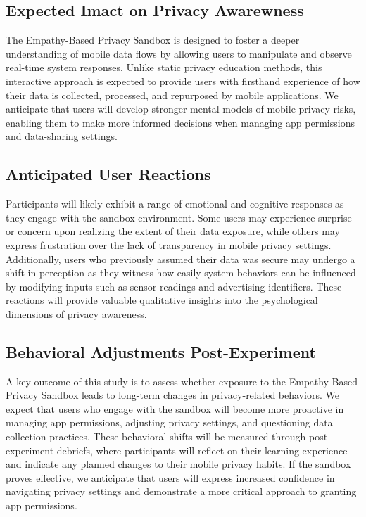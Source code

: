 \documentclass[acmlarge, nonacm]{acmart}
\begin{document}
\subsection{Expected Imact on Privacy Awarewness}

The Empathy-Based Privacy Sandbox is designed to foster a deeper understanding of mobile data flows by allowing users to manipulate and observe real-time system responses. Unlike static privacy education methods, this interactive approach is expected to provide users with firsthand experience of how their data is collected, processed, and repurposed by mobile applications. We anticipate that users will develop stronger mental models of mobile privacy risks, enabling them to make more informed decisions when managing app permissions and data-sharing settings.

\subsection{Anticipated User Reactions}
Participants will likely exhibit a range of emotional and cognitive responses as they engage with the sandbox environment. Some users may experience surprise or concern upon realizing the extent of their data exposure, while others may express frustration over the lack of transparency in mobile privacy settings. Additionally, users who previously assumed their data was secure may undergo a shift in perception as they witness how easily system behaviors can be influenced by modifying inputs such as sensor readings and advertising identifiers. These reactions will provide valuable qualitative insights into the psychological dimensions of privacy awareness.

\subsection{Behavioral Adjustments Post-Experiment}
A key outcome of this study is to assess whether exposure to the Empathy-Based Privacy Sandbox leads to long-term changes in privacy-related behaviors. We expect that users who engage with the sandbox will become more proactive in managing app permissions, adjusting privacy settings, and questioning data collection practices. These behavioral shifts will be measured through post-experiment debriefs, where participants will reflect on their learning experience and indicate any planned changes to their mobile privacy habits. If the sandbox proves effective, we anticipate that users will express increased confidence in navigating privacy settings and demonstrate a more critical approach to granting app permissions.
\end{document}
